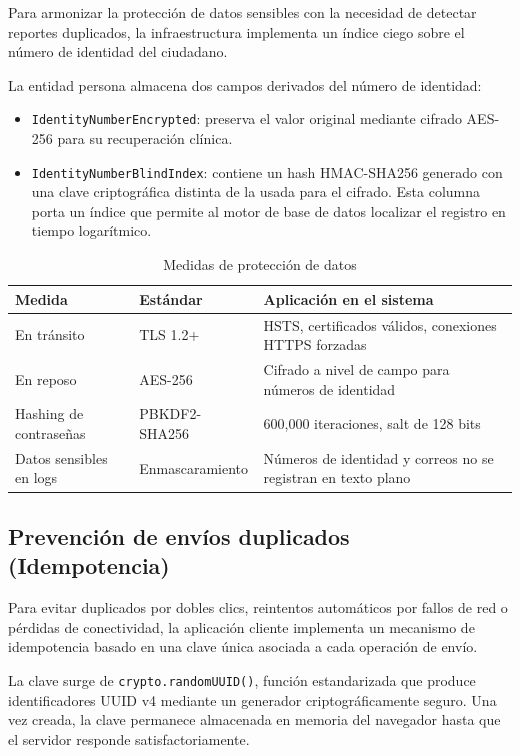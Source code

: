 \documentclass[12pt,letterpaper]{article}
\begin{document}
Para armonizar la protección de datos sensibles con la necesidad de detectar reportes duplicados, la infraestructura implementa un índice ciego sobre el número de identidad del ciudadano.

La entidad persona almacena dos campos derivados del número de identidad:

\begin{itemize}
    \item \texttt{IdentityNumberEncrypted}: preserva el valor original mediante cifrado AES-256 para su recuperación clínica.
    \item \texttt{IdentityNumberBlindIndex}: contiene un hash HMAC-SHA256 generado con una clave criptográfica distinta de la usada para el cifrado. Esta columna porta un índice que permite al motor de base de datos localizar el registro en tiempo logarítmico.
\end{itemize}

\begin{table}[H]
\centering
\caption{Medidas de protección de datos}
\label{tab:proteccion-datos}
\begin{tabular}{|l|l|p{8cm}|}
\hline
\textbf{Medida} & \textbf{Estándar} & \textbf{Aplicación en el sistema} \\ \hline
En tránsito & TLS 1.2+ & HSTS, certificados válidos, conexiones HTTPS forzadas \\ \hline
En reposo & AES-256 & Cifrado a nivel de campo para números de identidad \\ \hline
Hashing de contraseñas & PBKDF2-SHA256 & 600,000 iteraciones, salt de 128 bits \\ \hline
Datos sensibles en logs & Enmascaramiento & Números de identidad y correos no se registran en texto plano \\ \hline
\end{tabular}
\end{table}

\subsection{Prevención de envíos duplicados (Idempotencia)}

Para evitar duplicados por dobles clics, reintentos automáticos por fallos de red o pérdidas de conectividad, la aplicación cliente implementa un mecanismo de idempotencia basado en una clave única asociada a cada operación de envío.

La clave surge de \texttt{crypto.randomUUID()}, función estandarizada que produce identificadores UUID v4 mediante un generador criptográficamente seguro. Una vez creada, la clave permanece almacenada en memoria del navegador hasta que el servidor responde satisfactoriamente.
\end{document}
